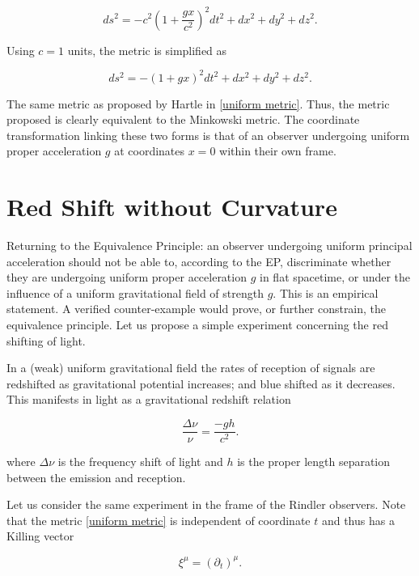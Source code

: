 \documentclass[11pt]{article}
\begin{document}
\begin{equation}
    ds^2 = -c^2 \left( 1 + \frac{gx}{c^2}\right)^2 dt^2 + dx^2 + dy^2 + dz^2.
\end{equation}

Using $c = 1$ units, the metric is simplified as

\begin{equation}
    ds^2 = -\left( 1 + gx\right)^2 dt^2 + dx^2 + dy^2 + dz^2.
\end{equation}

The same metric as proposed by Hartle in \eqref{uniform metric}. Thus, the metric proposed is clearly equivalent to the Minkowski metric. The coordinate transformation linking these two forms is that of an observer undergoing uniform proper acceleration $g$ at coordinates $x=0$ within their own frame. 

\section{Red Shift without Curvature}

Returning to the Equivalence Principle: an observer undergoing uniform principal acceleration should not be able to, according to the EP, discriminate whether they are undergoing uniform proper acceleration $g$ in flat spacetime, or under the influence of a uniform gravitational field of strength $g$. This is an empirical statement. A verified counter-example would prove, or further constrain, the equivalence principle. Let us propose a simple experiment concerning the red shifting of light.

In a (weak) uniform gravitational field the rates of reception of signals are redshifted as gravitational potential increases; and blue shifted as it decreases. This manifests in light as a gravitational redshift relation

\begin{equation}
    \label{grav-red-shift}
    \frac{\Delta \nu}{\nu} = \frac{-gh}{c^2}.
\end{equation}

where $\Delta \nu$ is the frequency shift of light and $h$ is the proper length separation between the emission and reception.

Let us consider the same experiment in the frame of the Rindler observers. Note that the metric \eqref{uniform metric} is independent of coordinate $t$ and thus has a Killing vector

\begin{equation}
    \xi^{\mu} = (\partial_t)^{\mu}.
\end{equation}
\end{document}
